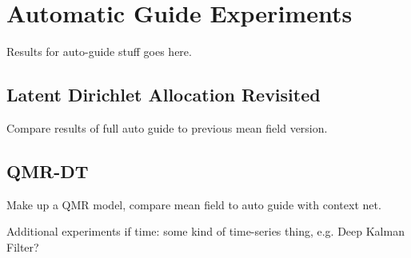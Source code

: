 \section{Automatic Guide Experiments}
\label{sec:results_autoGuide}

Results for auto-guide stuff goes here.


\subsection{Latent Dirichlet Allocation Revisited}
\label{sec:results_autoGuide_lda}

Compare results of full auto guide to previous mean field version.


\subsection{QMR-DT}
\label{sec:results_autoGuide_qmr}

Make up a QMR model, compare mean field to auto guide with context net.


Additional experiments if time: some kind of time-series thing, e.g. Deep Kalman Filter?
